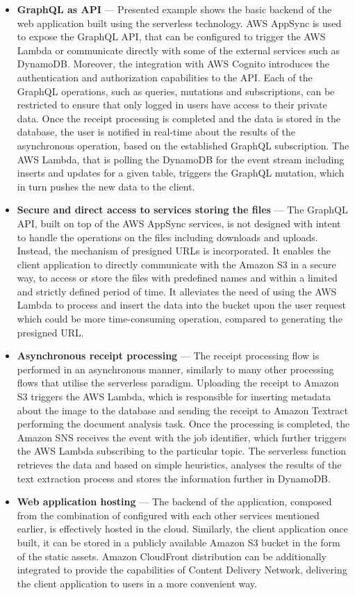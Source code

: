 \begin{itemize}
    \item \textbf{GraphQL as API} --- Presented example shows the basic backend of the web application built using the serverless technology. AWS AppSync is used to expose the GraphQL API, that can be configured to trigger the AWS Lambda or communicate directly with some of the external services such as DynamoDB. Moreover, the integration with AWS Cognito introduces the authentication and authorization capabilities to the API. Each of the GraphQL operations, such as queries, mutations and subscriptions, can be restricted to ensure that only logged in users have access to their private data. Once the receipt processing is completed and the data is stored in the database, the user is notified in real-time about the results of the asynchronous operation, based on the established GraphQL subscription. The AWS Lambda, that is polling the DynamoDB for the event stream including inserts and updates for a given table, triggers the GraphQL mutation, which in turn pushes the new data to the client.
    \item \textbf{Secure and direct access to services storing the files} --- The GraphQL API, built on top of the AWS AppSync services, is not designed with intent to handle the operations on the files including downloads and uploads. Instead, the mechanism of presigned URLs is incorporated. It enables the client application to directly communicate with the Amazon S3 in a secure way, to access or store the files with predefined names and within a limited and strictly defined period of time. It alleviates the need of using the AWS Lambda to process and insert the data into the bucket upon the user request which could be more time-consuming operation, compared to generating the presigned URL.
    \item \textbf{Asynchronous receipt processing} --- The receipt processing flow is performed in an asynchronous manner, similarly to many other processing flows that utilise the serverless paradigm. Uploading the receipt to Amazon S3 triggers the AWS Lambda, which is responsible for inserting metadata about the image to the database and sending the receipt to Amazon Textract performing the document analysis task. Once the processing is completed, the Amazon SNS receives the event with the job identifier, which further triggers the AWS Lambda subscribing to the particular topic. The serverless function retrieves the data and based on simple heuristics, analyses the results of the text extraction process and stores the information further in DynamoDB.
    \item \textbf{Web application hosting} --- The backend of the application, composed from the combination of configured with each other services mentioned earlier, is effectively hosted in the cloud. Similarly, the client application once built, it can be stored in a publicly available Amazon S3 bucket in the form of the static assets. Amazon CloudFront distribution can be additionally integrated to provide the capabilities of Content Delivery Network, delivering the client application to users in a more convenient way.  
\end{itemize}

